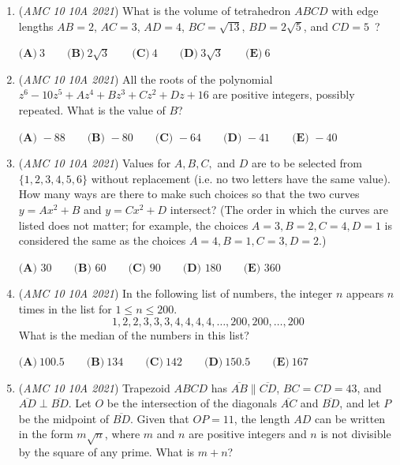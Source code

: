 \begin{enumerate}
$\textbf{(A) }1:1 \qquad \textbf{(B) }47:43 \qquad \textbf{(C) }2:1 \qquad \textbf{(D) }40:13 \qquad \textbf{(E) }4:1$


	\item (\textit{AMC 10 10A 2021}) What is the volume of tetrahedron $ABCD$ with edge lengths $AB = 2$, $AC = 3$, $AD = 4$, $BC = \sqrt{13}$, $BD = 2\sqrt{5}$, and $CD = 5$ ?


 $\textbf{(A)} ~3 \qquad\textbf{(B)} ~2\sqrt{3} \qquad\textbf{(C)} ~4\qquad\textbf{(D)} ~3\sqrt{3}\qquad\textbf{(E)} ~6$


	\item (\textit{AMC 10 10A 2021}) All the roots of the polynomial $z^6-10z^5+Az^4+Bz^3+Cz^2+Dz+16$ are positive integers, possibly repeated. What is the value of $B$?


 $\textbf{(A) }{-}88 \qquad \textbf{(B) }{-}80 \qquad \textbf{(C) }{-}64 \qquad \textbf{(D) }{-}41\qquad \textbf{(E) }{-}40$


	\item (\textit{AMC 10 10A 2021}) Values for $A,B,C,$ and $D$ are to be selected from $\{1, 2, 3, 4, 5, 6\}$ without replacement (i.e. no two letters have the same value). How many ways are there to make such choices so that the two curves $y=Ax^2+B$ and $y=Cx^2+D$ intersect? (The order in which the curves are listed does not matter; for example, the choices $A=3, B=2, C=4, D=1$ is considered the same as the choices $A=4, B=1, C=3, D=2.$)


 $\textbf{(A) }30 \qquad \textbf{(B) }60 \qquad \textbf{(C) }90 \qquad \textbf{(D) }180 \qquad \textbf{(E) }360$


	\item (\textit{AMC 10 10A 2021}) In the following list of numbers, the integer $n$ appears $n$ times in the list for $1 \leq n \leq 200$.
 \[1, 2, 2, 3, 3, 3, 4, 4, 4, 4, \dots, 200, 200, \dots , 200\]What is the median of the numbers in this list?


 $\textbf{(A)} ~100.5\qquad\textbf{(B)} ~134\qquad\textbf{(C)} ~142\qquad\textbf{(D)} ~150.5\qquad\textbf{(E)} ~167$


	\item (\textit{AMC 10 10A 2021}) Trapezoid $ABCD$ has $\overline{AB} \parallel \overline{CD}$, $BC = CD = 43$, and $\overline{AD} \perp \overline{BD}$. Let $O$ be the intersection of the diagonals $\overline{AC}$ and $\overline{BD}$, and let $P$ be the midpoint of $\overline{BD}$. Given that $OP = 11$, the length $AD$ can be written in the form $m\sqrt{n}$, where $m$ and $n$ are positive integers and $n$ is not divisible by the square of any prime. What is $m + n$?



\end{enumerate}
